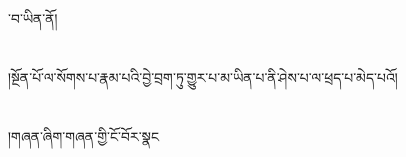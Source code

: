 ་བ་ཡིན་ནོ།\chapter{ }།སྔོན་པོ་ལ་སོགས་པ་རྣམ་པའི་བྱེ་བྲག་ཏུ་གྱུར་པ་མ་ཡིན་པ་ནི་ཤེས་པ་ལ་ཕྲད་པ་མེད་པའོ།\chapter{ }།གཞན་ཞིག་གཞན་གྱི་ངོ་བོར་སྣང